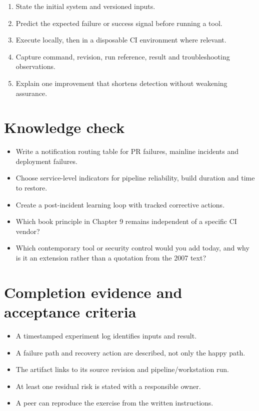 \documentclass[11pt,letterpaper]{article}
\begin{document}
\begin{enumerate}
\item State the initial system and versioned inputs.
\item Predict the expected failure or success signal before running a tool.
\item Execute locally, then in a disposable CI environment where relevant.
\item Capture command, revision, run reference, result and troubleshooting observations.
\item Explain one improvement that shortens detection without weakening assurance.
\end{enumerate}
\section{Knowledge check}
\begin{itemize}
\item Write a notification routing table for PR failures, mainline incidents and deployment failures.
\item Choose service-level indicators for pipeline reliability, build duration and time to restore.
\item Create a post-incident learning loop with tracked corrective actions.
\item Which book principle in Chapter 9 remains independent of a specific CI vendor?
\item Which contemporary tool or security control would you add today, and why is it an extension rather than a quotation from the 2007 text?
\end{itemize}
\section{Completion evidence and acceptance criteria}
\begin{itemize}
\item A timestamped experiment log identifies inputs and result.
\item A failure path and recovery action are described, not only the happy path.
\item The artifact links to its source revision and pipeline/workstation run.
\item At least one residual risk is stated with a responsible owner.
\item A peer can reproduce the exercise from the written instructions.
\end{itemize}
\end{document}
